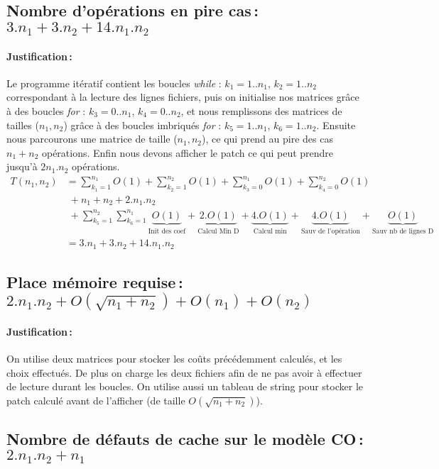 \documentclass[a4paper, 10pt, french]{article}
\begin{document}
  \subsection{Nombre  d'opérations en pire cas\,: $3.n_1 + 3.n_2 + 14.n_1.n_2$}
    \paragraph{Justification\,: }
    Le programme itératif contient les boucles \textit{while} : $k_1=1..n_1$, $k_2= 1..n_2$ correspondant à la lecture des lignes fichiers, puis on initialise nos matrices grâce à des boucles \textit{for} : $k_3=0..n_1$, $k_4= 0..n_2$, et nous remplissons des matrices de tailles ($n_1, n_2$) grâce à des boucles imbriqués \textit{for} : $k_5=1..n_1$, $k_6= 1..n_2$. Ensuite nous parcourons une matrice de taille ($n_1, n_2$), ce qui prend au pire des cas $n_1 + n_2$ opérations. Enfin nous devons afficher le patch ce qui peut prendre jusqu'à $2n_1.n_2$ opérations.
    \begin{align}
      T(n_1, n_2) &= \sum_{k_1=1}^{n_1} O(1) + \sum_{k_2=1}^{n_2} O(1) + \sum_{k_3=0}^{n_1} O(1) + \sum_{k_4=0}^{n_2} O(1)\\
      & \;+ n_1 + n_2 + 2.n_1.n_2 \\
      & \;+ \sum_{k_5=1}^{n_2} \sum_{k_6=1}^{n_1} \underbrace{O(1)}_{\text{Init des coef}} + \underbrace{2.O(1)}_{\text{Calcul Min D}} + \underbrace{4.O(1)}_{\text{Calcul min}} + \underbrace{4.O(1)}_{\text{Sauv de l'opération}} + \underbrace{O(1)}_{\text{Sauv nb de lignes D}}\\
      &= 3.n_1 + 3.n_2 + 14.n_1.n_2
    \end{align}

  \subsection{Place mémoire requise\,: $2.n_1.n_2 + O(\sqrt{n_1+n_2}) + O(n_1) + O(n_2)$}
    \paragraph{Justification\,: }
    On utilise deux matrices pour stocker les coûts précédemment calculés, et les choix effectués. De plus on charge les deux fichiers afin de ne pas avoir à effectuer de lecture durant les boucles.
    On utilise aussi un tableau de string pour stocker le patch calculé avant de l'afficher (de taille $O(\sqrt{n_1+n_2})$).

  \subsection{Nombre de défauts de cache sur le modèle CO\,: $2.n_1. n_2 + n_1$}
\end{document}
